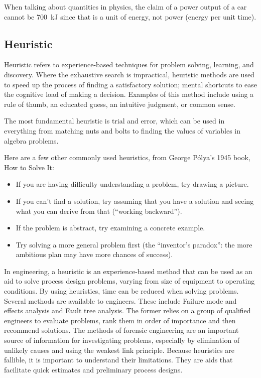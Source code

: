 When talking about quantities in physics, the claim of a power output of a car cannot be \SI{700}{kJ} since that is a unit of energy, not power (energy per unit time).


\subsection{Heuristic}
Heuristic refers to experience-based techniques for problem solving, learning, and discovery. Where the exhaustive search is impractical, heuristic methods are used to speed up the process of finding a satisfactory solution; mental shortcuts to ease the cognitive load of making a decision. Examples of this method include using a rule of thumb, an educated guess, an intuitive judgment, or common sense.

The most fundamental heuristic is trial and error, which can be used in everything from matching nuts and bolts to finding the values of variables in algebra problems.

Here are a few other commonly used heuristics, from George Pólya's 1945 book, How to Solve It:
\begin{itemize}
\item If you are having difficulty understanding a problem, try drawing a picture.
\item If you can't find a solution, try assuming that you have a solution and seeing what you can derive from that (``working backward'').
\item If the problem is abstract, try examining a concrete example.
\item Try solving a more general problem first (the ``inventor's paradox'': the more ambitious plan may have more chances of success).
\end{itemize}

In engineering, a heuristic is an experience-based method that can be used as an aid to solve process design problems, varying from size of equipment to operating conditions. By using heuristics, time can be reduced when solving problems. Several methods are available to engineers. These include Failure mode and effects analysis and Fault tree analysis. The former relies on a group of qualified engineers to evaluate problems, rank them in order of importance and then recommend solutions. The methods of forensic engineering are an important source of information for investigating problems, especially by elimination of unlikely causes and using the weakest link principle. Because heuristics are fallible, it is important to understand their limitations. They are aids that facilitate quick estimates and preliminary process designs.


